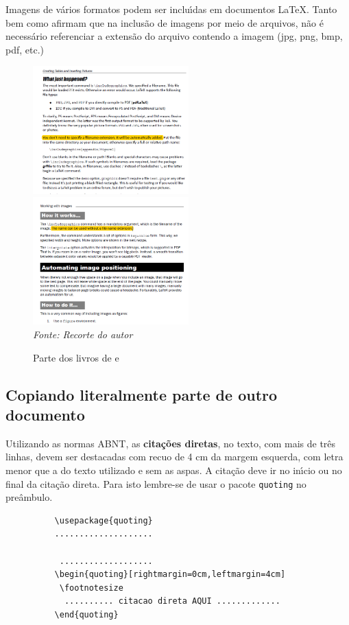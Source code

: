 Imagens de v\'{a}rios formatos podem ser inclu\'{\i}das em documentos \LaTeX{}. Tanto \cite{Kottwitz2011} bem como \cite{Kottwitz2015} afirmam que na inclus\~{a}o de imagens por meio de arquivos, n\~{a}o \'{e} necess\'{a}rio referenciar a extens\~{a}o do arquivo contendo a imagem (jpg, png, bmp, pdf, etc.)
\begin{figure}[H]
  \centering
  \caption{Parte dos livros de \cite{Kottwitz2011} e  \cite{Kottwitz2015}}
  \includegraphics[width=6cm]{beginers.png}\
   \includegraphics[width=6cm]{cookbook.png}\\
  \textit{\small Fonte: Recorte do autor}
\end{figure}

\subsection{Copiando literalmente parte de outro documento}

Utilizando as normas ABNT, as \textbf{cita\c{c}\~{o}es diretas}, no texto, com mais de tr\^{e}s linhas, devem ser destacadas com recuo de 4 cm da margem esquerda, com letra menor que a do texto utilizado e sem as aspas. A cita\c{c}\~{a}o deve ir no in\'{\i}cio ou no final da cita\c{c}\~{a}o direta. Para isto lembre-se de usar o pacote \texttt{quoting} no pre\^{a}mbulo.
\begin{verbatim}
          \usepackage{quoting}
          ....................
          
           ...................
          \begin{quoting}[rightmargin=0cm,leftmargin=4cm]
           \footnotesize
            .......... citacao direta AQUI .............
          \end{quoting}
\end{verbatim}

